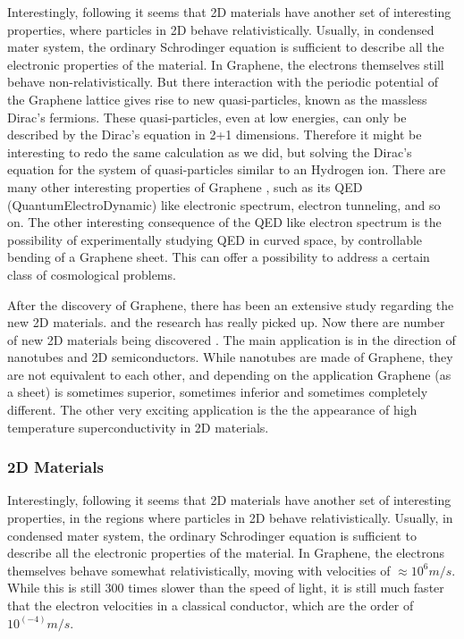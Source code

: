 Interestingly, following \cite{Graphene0} it seems that 2D materials have another set of interesting properties, where particles in 2D behave relativistically. Usually, in condensed mater system, the ordinary Schrodinger equation is sufficient to describe all the electronic properties of the material. In Graphene, the electrons themselves still behave non-relativistically. But there interaction with the periodic potential of the Graphene lattice gives rise to new quasi-particles, known as the massless Dirac's fermions. These quasi-particles, even at low energies, can only be described by the Dirac's equation in 2+1 dimensions. Therefore it might be interesting to redo the same calculation as we did, but solving the Dirac's equation for the system of quasi-particles similar to an Hydrogen ion.  There are many other interesting properties of Graphene \cite{Graphene0}, such as its QED (QuantumElectroDynamic) like electronic spectrum, electron tunneling, and so on. The other interesting consequence of the QED like electron spectrum is the possibility of experimentally studying QED in curved space, by controllable bending of a Graphene sheet. This can offer a possibility to address a certain class of cosmological problems. 

After the discovery of Graphene, there has been an extensive study regarding the new 2D materials. and the research has really picked up. Now there are number of new 2D materials being discovered \cite{Many2DMaterials}.  The main application is in the direction of nanotubes and 2D semiconductors. While nanotubes are made of Graphene, they are not equivalent to each other,  and depending on the application Graphene (as a sheet) is sometimes superior, sometimes inferior and sometimes completely different. The other very exciting  application is the the appearance of high temperature superconductivity in 2D materials\cite{2DSuper}.

\subsubsection*{2D Materials}

Interestingly, following \cite{Graphene0} it seems that 2D materials have another set of interesting properties, in the regions where particles in 2D behave relativistically. Usually, in condensed mater system, the ordinary Schrodinger equation is sufficient to describe all the electronic properties of the material. In Graphene, the electrons themselves behave somewhat relativistically, moving with velocities of $ \approx 10^6 m/s $. While this is still 300 times slower than the speed of light, it is still much faster that the electron velocities in a classical conductor, which are the order of $ 10^(-4) m/s $.

